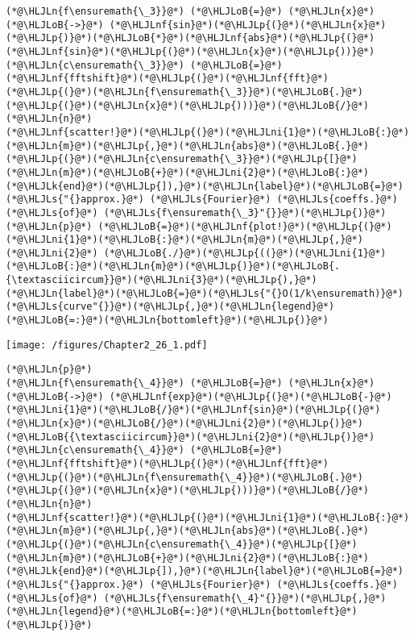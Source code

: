 \documentclass[12pt,landscape]{article}
\newcommand{\HLJLk}[1]{\textcolor[RGB]{148,91,176}{\textbf{#1}}}
\newcommand{\HLJLn}[1]{#1}
\newcommand{\HLJLnf}[1]{\textcolor[RGB]{66,102,213}{#1}}
\newcommand{\HLJLs}[1]{\textcolor[RGB]{201,61,57}{#1}}
\newcommand{\HLJLni}[1]{\textcolor[RGB]{59,151,46}{#1}}
\newcommand{\HLJLoB}[1]{\textcolor[RGB]{102,102,102}{\textbf{#1}}}
\newcommand{\HLJLp}[1]{#1}
\begin{document}
{\begin{lstlisting}
(*@\HLJLn{f\ensuremath{\_3}}@*) (*@\HLJLoB{=}@*) (*@\HLJLn{x}@*) (*@\HLJLoB{->}@*) (*@\HLJLnf{sin}@*)(*@\HLJLp{(}@*)(*@\HLJLn{x}@*)(*@\HLJLp{)}@*)(*@\HLJLoB{*}@*)(*@\HLJLnf{abs}@*)(*@\HLJLp{(}@*)(*@\HLJLnf{sin}@*)(*@\HLJLp{(}@*)(*@\HLJLn{x}@*)(*@\HLJLp{))}@*)
(*@\HLJLn{c\ensuremath{\_3}}@*) (*@\HLJLoB{=}@*) (*@\HLJLnf{fftshift}@*)(*@\HLJLp{(}@*)(*@\HLJLnf{fft}@*)(*@\HLJLp{(}@*)(*@\HLJLn{f\ensuremath{\_3}}@*)(*@\HLJLoB{.}@*)(*@\HLJLp{(}@*)(*@\HLJLn{x}@*)(*@\HLJLp{)))}@*)(*@\HLJLoB{/}@*)(*@\HLJLn{n}@*)
(*@\HLJLnf{scatter!}@*)(*@\HLJLp{(}@*)(*@\HLJLni{1}@*)(*@\HLJLoB{:}@*)(*@\HLJLn{m}@*)(*@\HLJLp{,}@*)(*@\HLJLn{abs}@*)(*@\HLJLoB{.}@*)(*@\HLJLp{(}@*)(*@\HLJLn{c\ensuremath{\_3}}@*)(*@\HLJLp{[}@*)(*@\HLJLn{m}@*)(*@\HLJLoB{+}@*)(*@\HLJLni{2}@*)(*@\HLJLoB{:}@*)(*@\HLJLk{end}@*)(*@\HLJLp{]),}@*)(*@\HLJLn{label}@*)(*@\HLJLoB{=}@*)(*@\HLJLs{"{}approx.}@*) (*@\HLJLs{Fourier}@*) (*@\HLJLs{coeffs.}@*) (*@\HLJLs{of}@*) (*@\HLJLs{f\ensuremath{\_3}"{}}@*)(*@\HLJLp{)}@*)
(*@\HLJLn{p}@*) (*@\HLJLoB{=}@*)(*@\HLJLnf{plot!}@*)(*@\HLJLp{(}@*)(*@\HLJLni{1}@*)(*@\HLJLoB{:}@*)(*@\HLJLn{m}@*)(*@\HLJLp{,}@*)(*@\HLJLni{2}@*) (*@\HLJLoB{./}@*)(*@\HLJLp{((}@*)(*@\HLJLni{1}@*)(*@\HLJLoB{:}@*)(*@\HLJLn{m}@*)(*@\HLJLp{)}@*)(*@\HLJLoB{.{\textasciicircum}}@*)(*@\HLJLni{3}@*)(*@\HLJLp{),}@*)(*@\HLJLn{label}@*)(*@\HLJLoB{=}@*)(*@\HLJLs{"{}O(1/k\ensuremath)}@*) (*@\HLJLs{curve"{}}@*)(*@\HLJLp{,}@*)(*@\HLJLn{legend}@*)(*@\HLJLoB{=:}@*)(*@\HLJLn{bottomleft}@*)(*@\HLJLp{)}@*)
\end{lstlisting}

\texttt{[image: /figures/Chapter2\_26\_1.pdf]}

\begin{lstlisting}
(*@\HLJLn{p}@*)
(*@\HLJLn{f\ensuremath{\_4}}@*) (*@\HLJLoB{=}@*) (*@\HLJLn{x}@*) (*@\HLJLoB{->}@*) (*@\HLJLnf{exp}@*)(*@\HLJLp{(}@*)(*@\HLJLoB{-}@*)(*@\HLJLni{1}@*)(*@\HLJLoB{/}@*)(*@\HLJLnf{sin}@*)(*@\HLJLp{(}@*)(*@\HLJLn{x}@*)(*@\HLJLoB{/}@*)(*@\HLJLni{2}@*)(*@\HLJLp{)}@*)(*@\HLJLoB{{\textasciicircum}}@*)(*@\HLJLni{2}@*)(*@\HLJLp{)}@*)
(*@\HLJLn{c\ensuremath{\_4}}@*) (*@\HLJLoB{=}@*) (*@\HLJLnf{fftshift}@*)(*@\HLJLp{(}@*)(*@\HLJLnf{fft}@*)(*@\HLJLp{(}@*)(*@\HLJLn{f\ensuremath{\_4}}@*)(*@\HLJLoB{.}@*)(*@\HLJLp{(}@*)(*@\HLJLn{x}@*)(*@\HLJLp{)))}@*)(*@\HLJLoB{/}@*)(*@\HLJLn{n}@*)
(*@\HLJLnf{scatter!}@*)(*@\HLJLp{(}@*)(*@\HLJLni{1}@*)(*@\HLJLoB{:}@*)(*@\HLJLn{m}@*)(*@\HLJLp{,}@*)(*@\HLJLn{abs}@*)(*@\HLJLoB{.}@*)(*@\HLJLp{(}@*)(*@\HLJLn{c\ensuremath{\_4}}@*)(*@\HLJLp{[}@*)(*@\HLJLn{m}@*)(*@\HLJLoB{+}@*)(*@\HLJLni{2}@*)(*@\HLJLoB{:}@*)(*@\HLJLk{end}@*)(*@\HLJLp{]),}@*)(*@\HLJLn{label}@*)(*@\HLJLoB{=}@*)(*@\HLJLs{"{}approx.}@*) (*@\HLJLs{Fourier}@*) (*@\HLJLs{coeffs.}@*) (*@\HLJLs{of}@*) (*@\HLJLs{f\ensuremath{\_4}"{}}@*)(*@\HLJLp{,}@*)(*@\HLJLn{legend}@*)(*@\HLJLoB{=:}@*)(*@\HLJLn{bottomleft}@*)(*@\HLJLp{)}@*)
\end{lstlisting}

}
\end{document}
